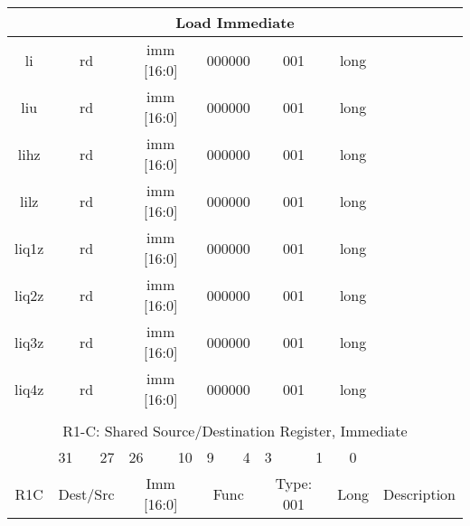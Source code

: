 \documentclass{article}
\begin{document}
\begin{center}
\begin{longtable}{|c|l|r|l|r|l|r|l|r|c|c|}
                    \multicolumn{11}{|c|}{Load Immediate} \\
    \hline li   &   \multicolumn{2}{|c|}{rd}    &   \multicolumn{2}{|c|}{imm [16:0]}    &   \multicolumn{2}{|c|}{000000}    &   \multicolumn{2}{|c|}{001}   &   long    & \\
    \hline liu  &   \multicolumn{2}{|c|}{rd}    &   \multicolumn{2}{|c|}{imm [16:0]}    &   \multicolumn{2}{|c|}{000000}    &   \multicolumn{2}{|c|}{001}   &   long    & \\
    \hline lihz &   \multicolumn{2}{|c|}{rd}    &   \multicolumn{2}{|c|}{imm [16:0]}    &   \multicolumn{2}{|c|}{000000}    &   \multicolumn{2}{|c|}{001}   &   long    & \\
    \hline lilz &   \multicolumn{2}{|c|}{rd}    &   \multicolumn{2}{|c|}{imm [16:0]}    &   \multicolumn{2}{|c|}{000000}    &   \multicolumn{2}{|c|}{001}   &   long    & \\
    \hline liq1z &  \multicolumn{2}{|c|}{rd}    &   \multicolumn{2}{|c|}{imm [16:0]}    &   \multicolumn{2}{|c|}{000000}    &   \multicolumn{2}{|c|}{001}   &   long    & \\
    \hline liq2z &  \multicolumn{2}{|c|}{rd}    &   \multicolumn{2}{|c|}{imm [16:0]}    &   \multicolumn{2}{|c|}{000000}    &   \multicolumn{2}{|c|}{001}   &   long    & \\
    \hline liq3z &  \multicolumn{2}{|c|}{rd}    &   \multicolumn{2}{|c|}{imm [16:0]}    &   \multicolumn{2}{|c|}{000000}    &   \multicolumn{2}{|c|}{001}   &   long    & \\
    \hline liq4z &  \multicolumn{2}{|c|}{rd}    &   \multicolumn{2}{|c|}{imm [16:0]}    &   \multicolumn{2}{|c|}{000000}    &   \multicolumn{2}{|c|}{001}   &   long    & \\
    
    \hline          \multicolumn{11}{c}{} \\
    
    
                    \multicolumn{11}{c}{R1-C: Shared Source/Destination Register, Immediate} \\ 
    \hline      &   \multicolumn{1}{l}{31}  &   27      &   \multicolumn{1}{l}{26}  &   10      &   \multicolumn{1}{l}{9}   &   4   &   \multicolumn{1}{l}{3}   &   1   &   0       & \\
    \hline R1C  &   \multicolumn{2}{|c|}{Dest/Src}      &   \multicolumn{2}{|c|}{Imm [16:0]}    &   \multicolumn{2}{|c|}{Func}      &   \multicolumn{2}{|c|}{Type: 001} &   Long    &   Description \\
    

\end{longtable}
\end{center}
\end{document}
